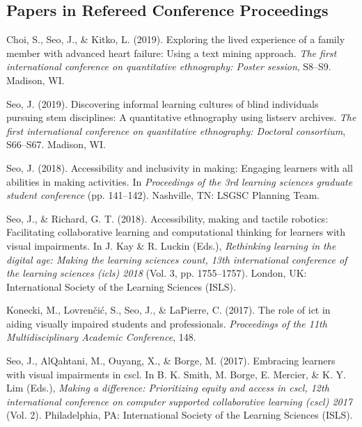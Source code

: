 \documentclass[11pt,a4paper,]{moderncv}
\newcounter{papers}
\begin{document}
\endgroup

\hypertarget{papers-in-refereed-conference-proceedings}{%
\subsection{Papers in Refereed Conference Proceedings}\label{papers-in-refereed-conference-proceedings}}

\begingroup
\setlength{\parindent}{-0.5in}
\setlength{\leftskip}{0.5in}

\hypertarget{refs_proceedings}{}
\leavevmode\hypertarget{ref-choi2019exploring}{}%
Choi, S., Seo, J., \& Kitko, L. (2019). Exploring the lived experience of a family member with advanced heart failure: Using a text mining approach. \emph{The first international conference on quantitative ethnography: Poster session}, S8--S9. Madison, WI.

\leavevmode\hypertarget{ref-seo2019discovering}{}%
Seo, J. (2019). Discovering informal learning cultures of blind individuals pursuing stem disciplines: A quantitative ethnography using listserv archives. \emph{The first international conference on quantitative ethnography: Doctoral consortium}, S66--S67. Madison, WI.

\leavevmode\hypertarget{ref-seo2018making}{}%
Seo, J. (2018). Accessibility and inclusivity in making: Engaging learners with all abilities in making activities. In \emph{Proceedings of the 3rd learning sciences graduate student conference} (pp. 141--142). Nashville, TN: LSGSC Planning Team.

\leavevmode\hypertarget{ref-seo2018accessibility}{}%
Seo, J., \& Richard, G. T. (2018). Accessibility, making and tactile robotics: Facilitating collaborative learning and computational thinking for learners with visual impairments. In J. Kay \& R. Luckin (Eds.), \emph{Rethinking learning in the digital age: Making the learning sciences count, 13th international conference of the learning sciences (icls) 2018} (Vol. 3, pp. 1755--1757). London, UK: International Society of the Learning Sciences (ISLS).

\leavevmode\hypertarget{ref-konecki2017role}{}%
Konecki, M., Lovrenčić, S., Seo, J., \& LaPierre, C. (2017). The role of ict in aiding visually impaired students and professionals. \emph{Proceedings of the 11th Multidisciplinary Academic Conference}, 148.

\leavevmode\hypertarget{ref-seo2017embracing}{}%
Seo, J., AlQahtani, M., Ouyang, X., \& Borge, M. (2017). Embracing learners with visual impairments in cscl. In B. K. Smith, M. Borge, E. Mercier, \& K. Y. Lim (Eds.), \emph{Making a difference: Prioritizing equity and access in cscl, 12th international conference on computer supported collaborative learning (cscl) 2017} (Vol. 2). Philadelphia, PA: International Society of the Learning Sciences (ISLS).
\end{document}
